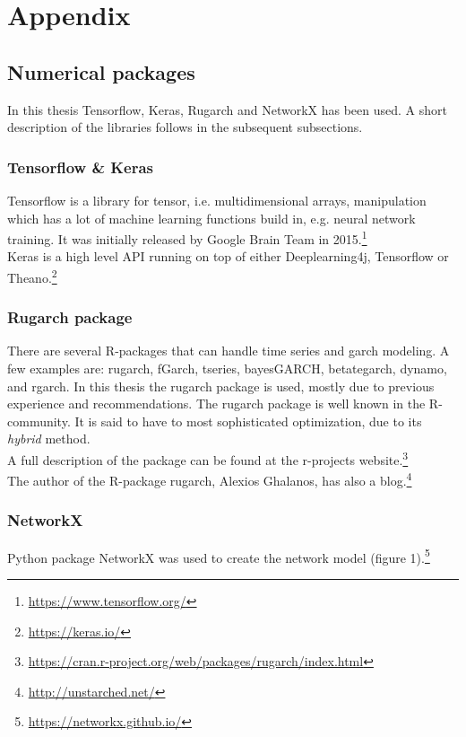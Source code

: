 \documentclass[12pt, letterpaper]{amsart}%
\begin{document}
\newpage

\section{Appendix}

\subsection{Numerical packages}
In this thesis Tensorflow, Keras, Rugarch and NetworkX has been used. A short description of the libraries follows in the subsequent subsections.

\subsubsection{Tensorflow \& Keras}
Tensorflow is a library for tensor, i.e. multidimensional arrays, manipulation which has a lot of machine learning functions build in, e.g. neural network training. It was initially released by Google Brain Team in 2015.\footnote{\url{https://www.tensorflow.org/}}
\\

Keras is a high level API running on top of either Deeplearning4j, Tensorflow or Theano.\footnote{\url{https://keras.io/}}

\subsubsection{Rugarch package}
There are several R-packages that can handle time series and garch modeling. A few examples are: rugarch, fGarch, tseries, bayesGARCH, betategarch, dynamo, and rgarch. In this thesis the rugarch package is used, mostly due to previous experience and recommendations. The rugarch package is well known in the R-community. It is said to have to most sophisticated optimization, due to its \textit{hybrid} method.
\\

A full description of the package can be found at the r-projects website.\footnote{\url{https://cran.r-project.org/web/packages/rugarch/index.html}}
\\

The author of the R-package rugarch, Alexios Ghalanos, has also a blog.\footnote{\url{http://unstarched.net/}}

\subsubsection{NetworkX}
Python package NetworkX was used to create the network model (figure 1).\footnote{\url{https://networkx.github.io/}}
\end{document}
